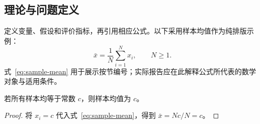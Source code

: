 \subsection{理论与问题定义}
定义变量、假设和评价指标，再引用相应公式。以下采用样本均值作为纯排版示例：
\begin{equation}\label{eq:sample-mean}
\bar x=\frac{1}{N}\sum_{i=1}^{N}x_i,\qquad N\ge1.
\end{equation}
式~\eqref{eq:sample-mean} 用于展示按节编号；实际报告应在此解释公式所代表的数学对象与适用条件。
\begin{proposition}[示例命题]
若所有样本均等于常数 $c$，则样本均值为 $c$。
\end{proposition}
\begin{proof}
将 $x_i=c$ 代入式~\eqref{eq:sample-mean}，得到 $\bar x=Nc/N=c$。
\end{proof}

